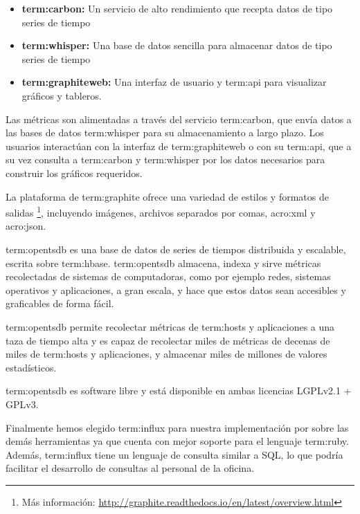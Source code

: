 \begin{itemize}

  \item \textbf{\gls{term:carbon}:}
  Un servicio de alto rendimiento que recepta datos de tipo series de tiempo

  \item \textbf{\gls{term:whisper}:}
  Una base de datos sencilla para almacenar datos de tipo series de tiempo

  \item \textbf{\gls{term:graphiteweb}:}
  Una interfaz de usuario y \gls{term:api} para visualizar gráficos y tableros.

\end{itemize}

Las métricas son alimentadas a través del servicio \gls{term:carbon}, que envía
datos a las bases de datos \gls{term:whisper} para su almacenamiento a largo
plazo. Los usuarios interactúan con la interfaz de \gls{term:graphiteweb} o con
su \gls{term:api}, que a su vez consulta a \gls{term:carbon} y
\gls{term:whisper} por los datos necesarios para construir los gráficos
requeridos.


La plataforma  de \gls{term:graphite} ofrece una variedad de estilos y
formatos de salidas \footnote{Más información:
\url{http://graphite.readthedocs.io/en/latest/overview.html}},
incluyendo imágenes, archivos separados por comas, \gls{acro:xml} y
\gls{acro:json}.

\gls{term:opentsdb} es una base de datos de series de tiempos distribuida y
escalable, escrita sobre \gls{term:hbase}. \gls{term:opentsdb} almacena, indexa
y sirve métricas recolectadas de sistemas de computadoras, como por ejemplo
redes, sistemas operativos y aplicaciones, a gran escala, y hace que estos
datos sean accesibles y graficables de forma fácil.

\gls{term:opentsdb} permite recolectar métricas de \glspl{term:host} y
aplicaciones a una taza de tiempo alta y es capaz de recolectar miles de
métricas de decenas de miles de \glspl{term:host} y aplicaciones, y almacenar
miles de millones de valores estadísticos.

\gls{term:opentsdb} es software libre y está disponible en ambas licencias
LGPLv2.1 + GPLv3. \cite{opentsdb}

Finalmente hemos elegido \gls{term:influx} para nuestra implementación por
sobre las demás herramientas ya que cuenta con mejor soporte para el lenguaje
\gls{term:ruby}. Además, \gls{term:influx} tiene un lenguaje de consulta similar
a SQL, lo que podría facilitar el desarrollo de consultas al personal de la
oficina.

